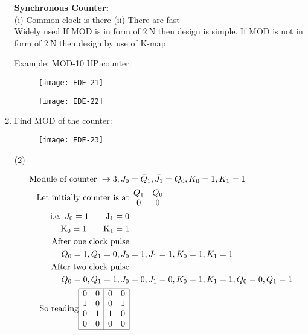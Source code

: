 \begin{enumerate}
\begin{answer}
 		\textbf{Synchronous Counter:}\\
 		(i) Common clock is there (ii) There are fast\\
 		Widely used If MOD is in form of $2 \mathrm{~N}$ then design is simple. If MOD is not in form of $2 \mathrm{~N}$ then design by use of K-map.
 	\end{answer}
	Example: MOD-10 UP counter.
	\begin{figure}[H]
		\centering
		\texttt{[image: EDE-21]}
	\end{figure}
\begin{figure}[H]
	\centering
	\texttt{[image: EDE-22]}
\end{figure}
 	\item Find MOD of the counter:
 	\begin{figure}[H]
 		\centering
 		\texttt{[image: EDE-23]}
 	\end{figure}
 	 \begin{tasks}(2)
 	\end{tasks}
 	\begin{answer}
 		\begin{align*}
 		\text { Module of counter } \rightarrow 3, J_{0}&=\bar{Q}_{1}, \bar{J}_{1}=Q_{0}, K_{0}=1, K_{1}=1\\
 	\text{	Let initially counter is at}&
 		\begin{array}{cc}Q_{1} & Q_{0} \\ 0 & 0\end{array}\\
 		\text{i.e. }J_{0}=1
 		\qquad\mathrm{J}_{1}=0\\
 		\mathrm{K}_{0}=1
 		\qquad\mathrm{K}_{1}=1\\
 		\text{After one clock pulse}\\
 		Q_{0}=1, Q_{1}=0, J_{0}&=1, J_{1}=1, K_{0}=1, K_{1}=1\\
 		\text{After two clock pulse}\\
 		Q_{0}=0, Q_{1}=1, J_{0}&=0, J_{1}=0, K_{0}=1, K_{1}=1, Q_{0}=0, Q_{1}=1\\
 		\text{So reading}\begin{array}{|ll|ll|}
 		\hline 0 & 0 & 0 & 0 \\
 		1 & 0 & 0 & 1 \\
 		0 & 1 & 1 & 0 \\
 		0 & 0 & 0 & 0 \\
 		\hline

\end{array}
\end{align*}
\end{answer}
\end{enumerate}
